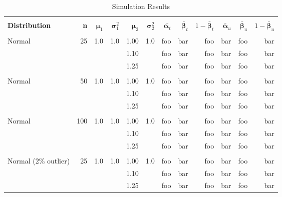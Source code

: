 \documentclass{report}
\begin{document}
\begin{table}[h]
	\centering
	\caption{Simulation Results}
	\vspace{1em}
	\begin{threeparttable}
	\begin{tabular}{|l r r r r r r r r r r r|}
		\hline
		& & & & & & & & & & & \\
		\textbf{Distribution} & 
		\textbf{n} & 
		$\bm{\mu}_1$ &
		$\bm{\sigma}^2_1$ & 
		$\bm{\mu}_2$ &
		$\bm{\sigma}^2_2$ & 
		$\bar{\bm{\alpha}_t}$ & 
		$\bar{\bm{\beta}}_t$ &
		$1 - \bar{\bm{\beta}}_t$ & 
		$\bar{\bm{\alpha}}_u$ & 
		$\bar{\bm{\beta}}_u$ & 
		$1 - \bar{\bm{\beta}}_u$ \\
		
		& & & & & & & & & & & \\

		Normal & 25 & 1.0 & 1.0 & 1.00 & 1.0 & foo & bar & foo & bar & foo & bar \\
		       &    &     &     & 1.10 &     & foo & bar & foo & bar  & foo & bar \\
		       &    &     &     & 1.25 &     & foo & bar & foo & bar & foo & bar \\

		& & & & & & & & & & & \\

		Normal & 50 & 1.0 & 1.0 & 1.00 & 1.0 & foo & bar & foo & bar & foo & bar \\
		       &    &     &     & 1.10 &     & foo & bar & foo & bar & foo & bar \\
		       &    &     &     & 1.25 &     & foo & bar & foo & bar & foo & bar \\

		& & & & & & & & & & & \\

		Normal & 100 & 1.0 & 1.0 & 1.00 & 1.0 & foo & bar & foo & bar & foo & bar \\
		       &    &     &     & 1.10 &      & foo & bar & foo & bar & foo & bar \\
		       &    &     &     & 1.25 &      & foo & bar & foo & bar & foo & bar \\

		& & & & & & & & & & & \\

		Normal (2\% outlier) & 25 & 1.0 & 1.0 & 1.00 & 1.0 & foo & bar & foo & bar& foo & bar \\
		       &    &     &     & 1.10 &     & foo & bar & foo & bar & foo & bar \\
		       &    &     &     & 1.25 &     & foo & bar & foo & bar & foo & bar \\


\end{tabular}
\end{threeparttable}
\end{table}
\end{document}
